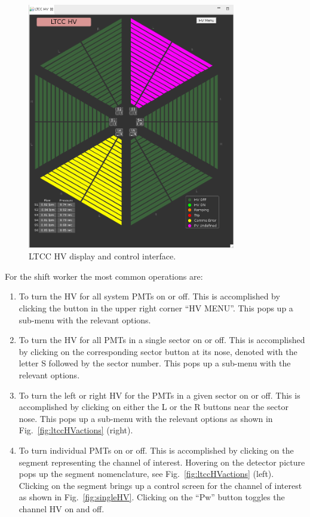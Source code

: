 \documentclass{article}
\begin{document}
\begin{figure}[ht]
  \centering
		\includegraphics[width=0.81\textwidth]{img/ltccHV}
		\caption{LTCC HV display and control interface. }
 		\label{fig:ltccHV}
\end{figure}

\clearpage

For the shift worker the most common operations are:

\begin{enumerate}
\item To turn the HV for all system PMTs on or off. This is accomplished by clicking the button in the 
upper right corner ``HV MENU''. This pops up a sub-menu with the relevant options.

\item To turn the HV for all PMTs in a single sector on or off. This is accomplished by clicking on 
the corresponding sector button at its nose, denoted with the letter S followed by the sector number. This pops up a 
sub-menu with the relevant options.

\item To turn the left or right HV for the PMTs in a given  sector on or off. This is accomplished by
clicking on either the L or the R buttons near the sector nose. This pops
up a sub-menu with the relevant options as shown in Fig.~\ref{fig:ltccHVactions} (right).

\item To turn individual PMTs on or off. This is accomplished by clicking on the segment representing 
the channel of interest. Hovering on the detector picture pops up the segment nomenclature, see 
Fig.~\ref{fig:ltccHVactions} (left). Clicking on the segment  brings up a control screen for the channel of interest as shown in
Fig.~\ref{fig:singleHV}. Clicking on the ``Pw'' button toggles the channel HV on and off.

\end{enumerate}
\end{document}

